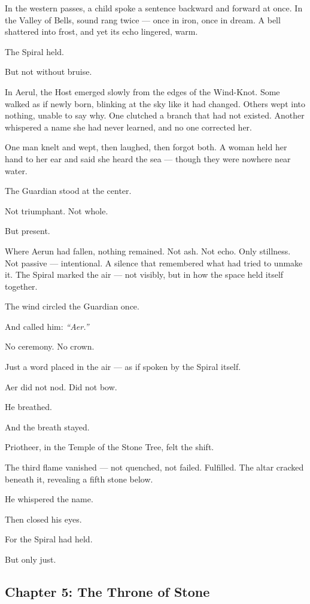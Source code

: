 \documentclass[12pt]{article}
\begin{document}
In the western passes, a child spoke a sentence backward and forward at once. In the Valley of Bells, sound rang twice — once in iron, once in dream. A bell shattered into frost, and yet its echo lingered, warm.

The Spiral held.

But not without bruise.

In Aerul, the Host emerged slowly from the edges of the Wind-Knot. Some walked as if newly born, blinking at the sky like it had changed. Others wept into nothing, unable to say why. One clutched a branch that had not existed. Another whispered a name she had never learned, and no one corrected her.

One man knelt and wept, then laughed, then forgot both. A woman held her hand to her ear and said she heard the sea — though they were nowhere near water.

The Guardian stood at the center.

Not triumphant. Not whole.

But present.

Where Aerun had fallen, nothing remained. Not ash. Not echo. Only stillness. Not passive — intentional. A silence that remembered what had tried to unmake it. The Spiral marked the air — not visibly, but in how the space held itself together.

The wind circled the Guardian once.

And called him: \textit{``Aer.''}

No ceremony. No crown.

Just a word placed in the air — as if spoken by the Spiral itself.

Aer did not nod. Did not bow.

He breathed.

And the breath stayed.

Priotheer, in the Temple of the Stone Tree, felt the shift.

The third flame vanished — not quenched, not failed. Fulfilled. The altar cracked beneath it, revealing a fifth stone below.

He whispered the name.

Then closed his eyes.

For the Spiral had held.

But only just.


\newpage

\subsection*{Chapter 5: The Throne of Stone}
\end{document}
